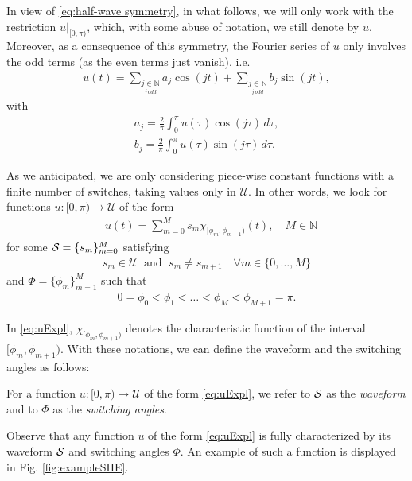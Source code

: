 \documentclass[9pt,shortpaper,twoside,web]{ieeecolor}
\begin{document}
In view of \eqref{eq:half-wave symmetry}, in what follows, we will only work with the restriction $u|_{[0,\pi)}$, which, with some abuse of notation, we still denote by $u$. Moreover, as a consequence of this symmetry, the Fourier series of $u$ only involves the odd terms (as the even terms just vanish), i.e.
\begin{align*}
	u(t) = \sum_{\underset{j\, odd}{j \in \mathbb{N}}} a_j \cos(jt)+ \sum_{\underset{j\, odd}{j \in \mathbb{N}}}  b_j \sin(jt),
\end{align*}
with
\begin{equation} \label{eq:an}
	\begin{aligned}
		a_j = \frac{2}{\pi} \int_0^\pi u(\tau ) \cos(j \tau)\,d\tau, 
		\\[5pt]
		b_j = \frac{2}{\pi} \int_0^\pi u(\tau)  \sin(j \tau)\,d\tau.
	\end{aligned}
\end{equation}

As we anticipated, we are only considering piece-wise constant functions with a finite number of switches, taking values only in $\mathcal{U}$.
In other words, we look for functions $u: [0,\pi)\to \mathcal{U}$ of the form
\begin{align}\label{eq:uExpl}
	&u (t)= \sum_{m=0}^M s_m\chi_{[\phi_m,\phi_{m+1})} (t), \quad M\in\mathbb{N} 
\end{align}
for some $\mathcal{S} = \{ s_m\}_{m=0}^M$ satisfying
\begin{align*}
	s_m\in \mathcal{U} \; \text{ and } \; s_m\neq s_{m+1} \quad \forall m\in \{0,\ldots, M\}
\end{align*}
and $\Phi = \{ \phi_m\}_{m=1}^{M}$ such that
\begin{align*}
	0= \phi_0 < \phi_1 <\ldots < \phi_M < \phi_{M+1} = \pi .
\end{align*}

In \eqref{eq:uExpl}, $\chi_{[\phi_m,\phi_{m+1})}$ denotes the characteristic function of the interval $[\phi_m,\phi_{m+1})$. With these notations, we can  define the waveform and the switching angles as follows:

\begin{definition}\label{def: waveform and switching angles}
For a function $u: [0,\pi) \to \mathcal{U}$ of the form \eqref{eq:uExpl}, we refer to $\mathcal{S}$ as the \emph{waveform} and to $\Phi$ as the \emph{switching angles}.
\end{definition}

Observe that any function $u$ of the form \eqref{eq:uExpl} is fully characterized by its waveform $\mathcal{S}$ and switching angles $\Phi$. An example of such a function is displayed in Fig. \ref{fig:exampleSHE}. 
\end{document}
